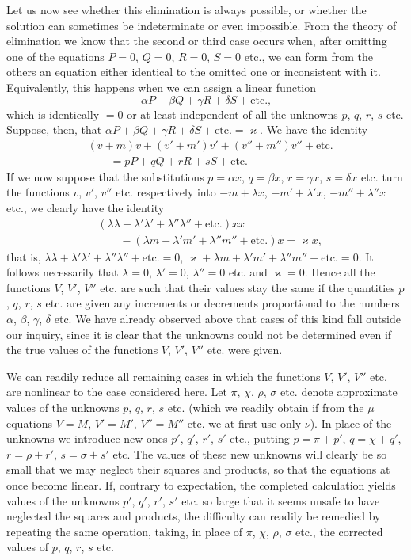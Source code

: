 Let us now see whether this elimination is always possible, or whether the solution can sometimes be indeterminate or even impossible. From the theory of elimination we know that the second or third case occurs when, after omitting one of the equations $P=0$, $Q=0$, $R=0$, $S=0$ etc., we can form from the others an equation either identical to the omitted one or inconsistent with it. Equivalently, this happens when we can assign a linear function
\[
\alpha P+\beta Q+\gamma R+\delta S+\text{etc.,}
\]
which is identically $=0$ or at least independent of all the unknowns $p$, $q$, $r$, $s$ etc. Suppose, then, that $\alpha P+\beta Q+\gamma R+\delta S+\text{etc.}=\varkappa$. We have the identity
\[
\begin{aligned}
&(v+m)v+(v'+m')v'+(v''+m'')v''+\text{etc.}\\
&\qquad=pP+qQ+rR+sS+\text{etc.}
\end{aligned}
\]
If we now suppose that the substitutions $p=\alpha x$, $q=\beta x$, $r=\gamma x$, $s=\delta x$ etc. turn the functions $v$, $v'$, $v''$ etc. respectively into $-m+\lambda x$, $-m'+\lambda'x$, $-m''+\lambda''x$ etc., we clearly have the identity
\[
\begin{aligned}
&(\lambda\lambda+\lambda'\lambda'+\lambda''\lambda''+\text{etc.})xx\\
&\qquad-(\lambda m+\lambda'm'+\lambda''m''+\text{etc.})x=\varkappa x,
\end{aligned}
\]
that is, $\lambda\lambda+\lambda'\lambda'+\lambda''\lambda''+\text{etc.}=0$, $\varkappa+\lambda m+\lambda'm'+\lambda''m''+\text{etc.}=0$. It follows necessarily that $\lambda=0$, $\lambda'=0$, $\lambda''=0$ etc. and $\varkappa=0$. Hence all the functions $V$, $V'$, $V''$ etc. are such that their values stay the same if the quantities $p$, $q$, $r$, $s$ etc. are given any increments or decrements proportional to the numbers $\alpha$, $\beta$, $\gamma$, $\delta$ etc. We have already observed above that cases of this kind fall outside our inquiry, since it is clear that the unknowns could not be determined even if the true values of the functions $V$, $V'$, $V''$ etc. were given.

We can readily reduce all remaining cases in which the functions $V$, $V'$, $V''$ etc. are nonlinear to the case considered here. Let $\pi$, $\chi$, $\rho$, $\sigma$ etc. denote approximate values of the unknowns $p$, $q$, $r$, $s$ etc. (which we readily obtain if from the $\mu$ equations $V=M$, $V'=M'$, $V''=M''$ etc. we at first use only $\nu$). In place of the unknowns we introduce new ones $p'$, $q'$, $r'$, $s'$ etc., putting $p=\pi+p'$, $q=\chi+q'$, $r=\rho+r'$, $s=\sigma+s'$ etc. The values of these new unknowns will clearly be so small that we may neglect their squares and products, so that the equations at once become linear. If, contrary to expectation, the completed calculation yields values of the unknowns $p'$, $q'$, $r'$, $s'$ etc. so large that it seems unsafe to have neglected the squares and products, the difficulty can readily be remedied by repeating the same operation, taking, in place of $\pi$, $\chi$, $\rho$, $\sigma$ etc., the corrected values of $p$, $q$, $r$, $s$ etc.
